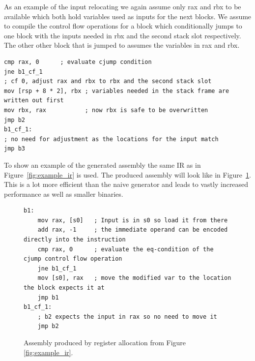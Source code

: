 \documentclass[course=eragp]{aspdoc}
\begin{document}
\par

As an example of the input relocating we again assume only rax and rbx to be available which both hold variables used as inputs for the next blocks.
We assume to compile the control flow operations for a block which conditionally jumps to one block with the inputs needed in rbx and the second stack slot respectively.
The other other block that is jumped to assumes the variables in rax and rbx.
\begin{lstlisting}[language={[x86masm]Assembler},float=h]
cmp rax, 0      ; evaluate cjump condition
jne b1_cf_1
; cf 0, adjust rax and rbx to rbx and the second stack slot
mov [rsp + 8 * 2], rbx ; variables needed in the stack frame are written out first
mov rbx, rax           ; now rbx is safe to be overwritten
jmp b2
b1_cf_1:
; no need for adjustment as the locations for the input match
jmp b3
\end{lstlisting}

\FloatBarrier

To show an example of the generated assembly the same IR as in Figure~\ref{fig:example_ir} is used.
The produced assembly will look like in Figure~\ref{fig:reg_gen_asm}.
This is a lot more efficient than the naive generator and leads to vastly increased performance as well as smaller binaries.
\begin{figure}[h]
    \centering
    \begin{lstlisting}[language={[x86masm]Assembler}]
b1:
    mov rax, [s0]   ; Input is in s0 so load it from there
    add rax, -1     ; the immediate operand can be encoded directly into the instruction
    cmp rax, 0      ; evaluate the eq-condition of the cjump control flow operation
    jne b1_cf_1
    mov [s0], rax   ; move the modified var to the location the block expects it at
    jmp b1
b1_cf_1:
    ; b2 expects the input in rax so no need to move it
    jmp b2
\end{lstlisting}
    \caption{Assembly produced by register allocation from Figure \ref{fig:example_ir}.}\label{fig:reg_gen_asm}
\end{figure}
\end{document}
